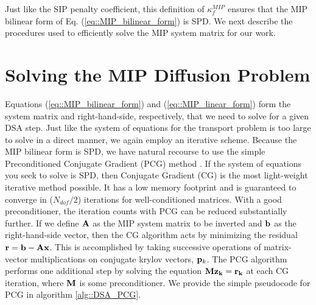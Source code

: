 \noindent Just like the SIP penalty coefficient, this definition of $\kappa_f^{MIP}$ ensures that the MIP bilinear form of Eq. (\ref{eq::MIP_bilinear_form}) is SPD. We next describe the procedures used to efficiently solve the MIP system matrix for our work.

\section{Solving the MIP Diffusion Problem}
\label{sec::DSA_Solving}

Equations (\ref{eq::MIP_bilinear_form}) and (\ref{eq::MIP_linear_form}) form the system matrix and right-hand-side, respectively, that we need to solve for a given DSA step. Just like the system of equations for the transport problem is too large to solve in a direct manner, we again employ an iterative scheme. Because the MIP bilinear form is SPD, we have natural recourse to use the simple Preconditioned Conjugate Gradient (PCG) method \cite{saad2003iterative}. If the system of equations you seek to solve is SPD, then Conjugate Gradient (CG) is the most light-weight iterative method possible. It has a low memory footprint and is guaranteed to converge in ($N_{dof}/2$) iterations for well-conditioned matrices. With a good preconditioner, the iteration counts with PCG can be reduced substantially further. If we define ${\bf A}$ as the MIP system matrix to be inverted and ${\bf b}$ as the right-hand-side vector, then the CG algorithm acts by minimizing the residual ${\bf r} = {\bf b} - {\bf A} {\bf x}$. This is accomplished by taking successive operations of matrix-vector multiplications on conjugate krylov vectors, ${\bf p}_k$. The PCG algorithm performs one additional step by solving the equation ${\bf M} {\bf z_k} = {\bf r_k}$ at each CG iteration, where ${\bf M}$ is some preconditioner. We provide the simple pseudocode for PCG in algorithm \ref{alg::DSA_PCG}.

